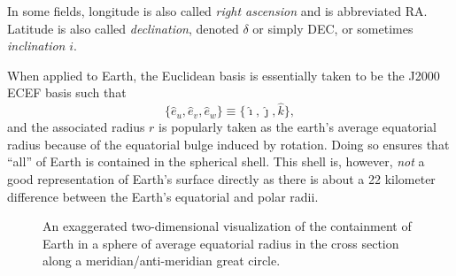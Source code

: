 \documentclass[11pt,dvipsnames]{thesis}
\begin{document}
In some fields, longitude is also called \textit{right ascension} and is abbreviated RA. Latitude is also called \textit{declination}, denoted $\delta$ or simply DEC, or sometimes \textit{inclination} $i$.

When applied to Earth, the Euclidean basis is essentially taken to be the J2000 ECEF basis such that
\begin{equation}
\{\hat{e}_u, \hat{e}_v, \hat{e}_w\} \equiv \{\hat{\imath}, \hat{\jmath}, \hat{k}\},
\end{equation}
and the associated radius $r$ is popularly taken as the earth's average equatorial radius because of the equatorial bulge induced by rotation. Doing so ensures that ``all'' of Earth is contained in the spherical shell. This shell is, however, \textit{not} a good representation of Earth's surface directly as there is about a 22 kilometer difference between the Earth's equatorial and polar radii.
\begin{figure}[H]
\centering
{}
\caption{An exaggerated two-dimensional visualization of the containment of Earth in a sphere of average equatorial radius in the cross section along a meridian/anti-meridian great circle.}
\end{figure}


\end{document}
